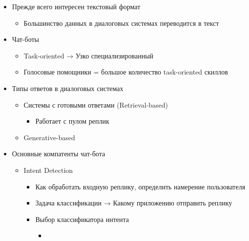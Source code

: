 \documentclass[a4paper, 12pt]{article}
\begin{document}
\begin{itemize}
\item
  
  Прежде всего интересен текстовый формат
  

  \begin{itemize}
  \item
    
    Большинство данных в диалоговых системах переводится в текст
    
  \end{itemize}
\item
  
  Чат-боты
  

  \begin{itemize}
  \item
    
    Task-oriented → Узко специализированный
    
  \item
    
    Голосовые помощники = большое количество task-oriented скиллов
    
  \end{itemize}
\item
  
  {Типы ответов в диалоговых системах}
  

  \begin{itemize}
  \item
    
    Системы с готовыми ответами (Retrieval-based)
    

    \begin{itemize}
    \item
      
      Работает с пулом реплик
      
    \end{itemize}
  \item
    
    Generative-based
    
  \end{itemize}
\item Основные компатенты чат-бота
  \begin{itemize}
  \item Intent Detection
    \begin{itemize}
    \item Как обработать входную реплику, определить намерение пользователя
    \item Задача классификации → Какому приложению отправить реплику
    \item Выбор классификатора интента
      \begin{itemize}
      \item
        

\end{itemize}
\end{itemize}
\end{itemize}
\end{itemize}
\end{document}
